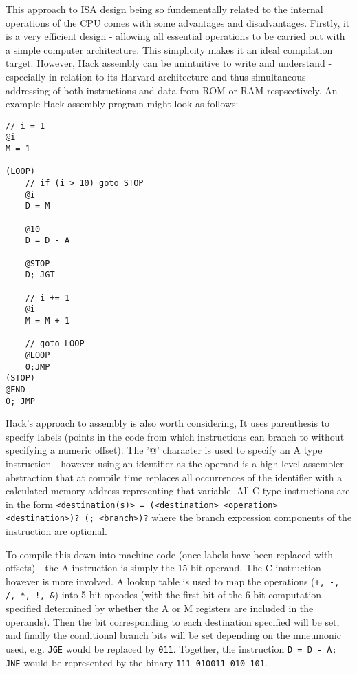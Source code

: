 
\bigskip

This approach to ISA design being so fundementally related to the internal operations of the CPU comes with some advantages and disadvantages. Firstly, it is a very efficient design - allowing all essential operations to be carried out with a simple computer architecture. This simplicity makes it an ideal compilation target. However, Hack assembly can be unintuitive to write and understand - especially in relation to its Harvard architecture and thus simultaneous addressing of both instructions and data from ROM or RAM respsectively. An example Hack assembly program might look as follows:
\begin{lstlisting}
// i = 1
@i
M = 1

(LOOP)
    // if (i > 10) goto STOP
    @i 
    D = M

    @10
    D = D - A

    @STOP
    D; JGT

    // i += 1
    @i
    M = M + 1

    // goto LOOP
    @LOOP
    0;JMP
(STOP)
@END
0; JMP
\end{lstlisting}

Hack's approach to assembly is also worth considering, It uses parenthesis to specify labels (points in the code from which instructions can branch to without specifying a numeric offset). The '@' character is used to specify an A type instruction - however using an identifier as the operand is a high level assembler abstraction that at compile time replaces all occurrences of the identifier with a calculated memory address representing that variable. All C-type instructions are in the form \texttt{<destination(s)> = (<destination> <operation> <destination>)? (; <branch>)?} where the branch expression components of the instruction are optional. 

To compile this down into machine code (once labels have been replaced with offsets) - the A instruction is simply the 15 bit operand. The C instruction however is more involved. A lookup table is used to map the operations (\texttt{+, -, /, *, !, \&}) into 5 bit opcodes (with the first bit of the 6 bit computation specified determined by whether the A or M registers are included in the operands). Then the bit corresponding to each destination specified will be set, and finally the conditional branch bits will be set depending on the mneumonic used, e.g. \texttt{JGE} would be replaced by \texttt{011}. Together, the instruction \texttt{D = D - A; JNE} would be represented by the binary \texttt{111 010011 010 101}. 

